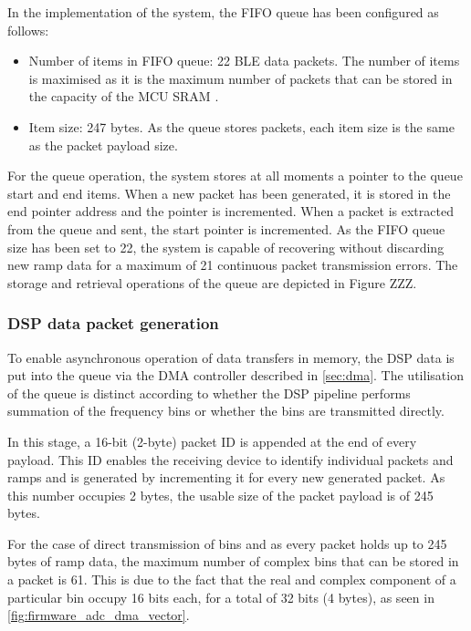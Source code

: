 In the implementation of the system, the FIFO queue has been configured as follows:
\begin{itemize}
	\item Number of items in FIFO queue: 22 BLE data packets. The number of items is maximised as it is the maximum number of packets that can be stored in the capacity of the MCU SRAM \cite{STMicroelectronics2022a}.
	\item Item size: 247 bytes. As the queue stores packets, each item size is the same as the packet payload size.
\end{itemize}

For the queue operation, the system stores at all moments a pointer to the queue start and end items. When a new packet has been generated, it is stored in the end pointer address and the pointer is incremented. When a packet is extracted from the queue and sent, the start pointer is incremented. As the FIFO queue size has been set to 22, the system is capable of recovering without discarding new ramp data for a maximum of 21 continuous packet transmission errors.
The storage and retrieval operations of the queue are depicted in Figure ZZZ.

\subsubsection{DSP data packet generation} \label{sec:packet_generation}

To enable asynchronous operation of data transfers in memory, the DSP data is put into the queue via the DMA controller described in \cref{sec:dma}. The utilisation of the queue is distinct according to whether the DSP pipeline performs summation of the frequency bins or whether the bins are transmitted directly.

In this stage, a 16-bit (2-byte) packet ID is appended at the end of every payload. This ID enables the receiving device to identify individual packets and ramps and is generated by incrementing it for every new generated packet. As this number occupies 2 bytes, the usable size of the packet payload is of 245 bytes.

For the case of direct transmission of bins and as every packet holds up to 245 bytes of ramp data, the maximum number of complex bins that can be stored in a packet is 61. This is due to the fact that the real and complex component of a particular bin occupy 16 bits each, for a total of 32 bits (4 bytes), as seen in \cref{fig:firmware_adc_dma_vector}.

